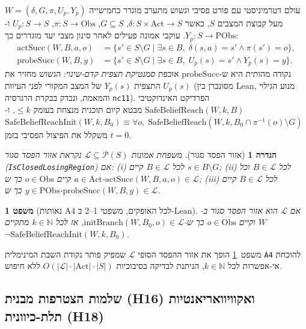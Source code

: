 \documentclass[10pt,a4paper]{article}
\newcommand{\code}[1]{\foreignlanguage{english}{\nolinkurl{#1}}}
\newcommand{\ltr}[1]{\foreignlanguage{english}{#1}}
\newtheorem{definition}{הגדרה}[section]
\newtheorem{theorem}{משפט}[section]
\begin{document}
עולם דטרמיניסטי עם פורט פסיבי וגשוש מתערב מוגדר כחמישייה $W = (\delta, G, \pi, U_p, Y_p)$ מעל קבוצת המצבים $S$, כאשר $\delta: S \times \mathrm{Act} \to S$, $G \subseteq S$, $\pi: S \to \mathrm{Obs}$, $U_p: S \to S$ ו-$Y_p: S \to \mathrm{PObs}$. עוקבי אמונה פעילים לאחר סינון מצבי יעד מוגדרים כך:
\begin{align*}
\mathrm{actSucc}(W, B, a, o) &= \{ s' \in S \setminus G \mid \exists s \in B,\; \delta(s, a) = s' \land \pi(s') = o \}, \\
\mathrm{probeSucc}(W, B, y)  &= \{ s' \in S \setminus G \mid \exists s \in B,\; U_p(s) = s' \land Y_p(s) = y \}.
\end{align*}
נקודה מהותית היא ש-$\mathrm{probeSucc}$ אוכפת \emph{סמנטיקת תצפית קדם-שינוי}: הגשוש מחזיר את התצפית $Y_p(s)$ של המצב המקורי לפני העיוות $U_p(s)$ (מסונכרן בין \ltr{Lean}, מנוע הגילוי והמאמת, ונבדק בבקרת הרגרסיה \code{nc11}). הפרדיקט האינדוקטיבי $\mathrm{SafeBeliefReach}(W, k, B)$ מבטא קיום תוכנית מנצחת בעומק $\le k$, ו-$\mathrm{SafeBeliefReachInit}(W, k, B_0) \equiv \forall o,\; \mathrm{SafeBeliefReach}(W, k, B_0 \cap \pi^{-1}(o) \setminus G)$ משקלל את הפיצול הפסיבי בזמן $t=0$.

\begin{definition}[אזור הפסד סגור]\label{def:clr}
משפחת אמונות $\mathcal{L} \subseteq \mathcal{P}(S)$ נקראת \emph{אזור הפסד סגור} (\code{IsClosedLosingRegion}) אם:
(i) לכל $B \in \mathcal{L}$ קיים $s \in B \setminus G$;
(ii) לכל $B \in \mathcal{L}$ וכל $a \in \mathrm{Act}$ קיים $o \in \mathrm{Obs}$ כך ש-$\mathrm{actSucc}(W,B,a,o) \in \mathcal{L}$;
(iii) לכל $B \in \mathcal{L}$ קיים $y \in \mathrm{PObs}$ כך ש-$\mathrm{probeSucc}(W,B,y) \in \mathcal{L}$.
\end{definition}

\begin{theorem}[נאותות A4 לכל האופקים, משפטי 1--2 ב-Lean]\label{thm:a4}
אם $\mathcal{L}$ הוא אזור הפסד סגור ב-$W$ וקיים $o \in \mathrm{Obs}$ כך ש-$\mathrm{initBranch}(W, B_0, o) \in \mathcal{L}$, אז לכל $k \in \mathbb{N}$ מתקיים $\neg\mathrm{SafeBeliefReachInit}(W, k, B_0)$.
\end{theorem}

משפט~\ref{thm:a4} הופך את אזור ההפסד הסופי $\mathcal{L}$ שמפיק פותר נקודת השבת המינימלית \code{A4} להוכחת אי-אפשרות לכל $k \in \mathbb{N}$, הניתנת לבדיקה בסיבוכיות $O(|\mathcal{L}|\cdot|\mathrm{Act}|\cdot|S|)$ ללא חיפוש.

\subsection{שלמות הצטרפות מבנית (H16) ואקוויוואריאנטיות תלת-כיוונית (H18)}
\end{document}
